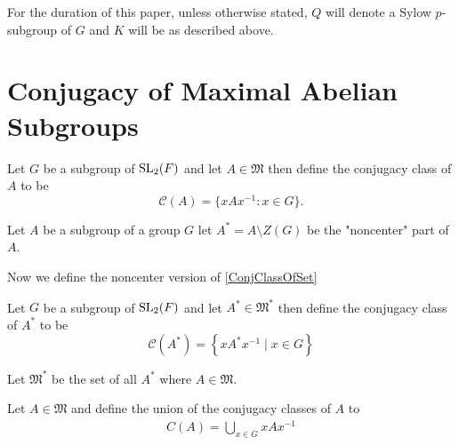 For the duration of this paper, unless otherwise stated, $Q$ will denote a Sylow $p$-subgroup of $G$ and $K$ will be as described above. 


\section{Conjugacy of Maximal Abelian Subgroups}

\begin{definition}
  \label{ConjClassOfSet}
  \leanok
  Let $G$ be a subgroup of $\operatorname{SL}_2(F)$ and let $A \in \mathfrak{M}$ then define the conjugacy class of $A$ to be 
  \[
  \mathcal{C}(A) = \{ x A x^{-1} : x \in G \}.
  \]
\end{definition}

\begin{definition}
  \label{Subgroup.noncenter}
  \leanok
  Let $A$ be a subgroup of a group $G$ let $A^* = A \setminus Z(G)$ be the "noncenter" part of $A$.
\end{definition}

Now we define the noncenter version of \ref{ConjClassOfSet}

\begin{definition}
  \label{noncenter_ConjClassOfSet}
  \leanok
  Let $G$ be a subgroup of $\operatorname{SL}_2(F)$ and let $A^* \in \mathfrak{M}^*$ then define the conjugacy class of $A^*$ to be
  \[
  \mathcal{C}(A^*) = \left\{x A^* x^{-1} \; | \; x \in G \right\}
   \]
\end{definition}

\begin{definition}
\label{noncenter_MaximalAbelianSubgroupsOf}
\leanok
Let $\mathfrak{M}^*$ be the set of all $A^*$ where $A \in \mathfrak{M}$.
\end{definition}

\begin{definition}
\label{C}
\leanok
Let $A \in \mathfrak{M}$ and define the union of the conjugacy classes of $A$ to
\begin{align*} 
  C(A) = \bigcup_{x \in G} x A x^{-1}
\end{align*}
\end{definition}

